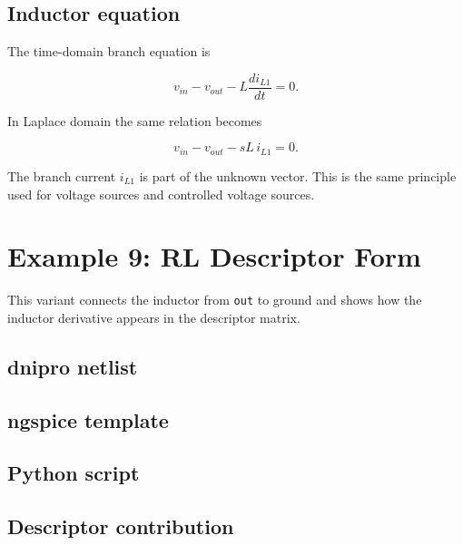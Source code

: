 \documentclass[11pt,a4paper]{article}
\newcommand{\code}[1]{\texttt{#1}}
\begin{document}


\subsection{Inductor equation}

The time-domain branch equation is

\begin{equation}
    v_{in} - v_{out} - L\frac{d i_{L1}}{dt} = 0.
\end{equation}

In Laplace domain the same relation becomes

\begin{equation}
    v_{in} - v_{out} - sL\,i_{L1} = 0.
\end{equation}

The branch current \(i_{L1}\) is part of the unknown vector. This is the same
principle used for voltage sources and controlled voltage sources.

\section{Example 9: RL Descriptor Form}
\label{sec:ex-rl-descriptor}

This variant connects the inductor from \code{out} to ground and shows how the
inductor derivative appears in the descriptor matrix.

\subsection{dnipro netlist}



\subsection{ngspice template}



\subsection{Python script}



\subsection{Descriptor contribution}
\end{document}

